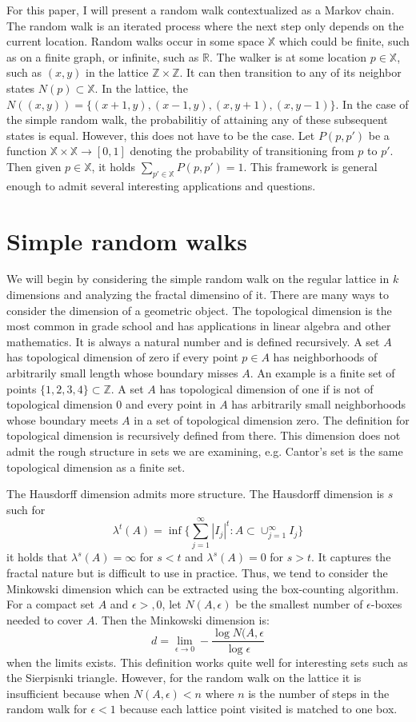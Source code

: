 \documentclass{article}
\begin{document}
For this paper, I will present a random walk contextualized as a Markov chain. The random walk is an iterated process where the next step only depends on the current location. Random walks occur in some space $\mathbb{X}$ which could be finite, such as on a finite graph, or infinite, such as $\mathbb{R}$. The walker is at some location $p \in \mathbb{X}$, such as $(x,y)$ in the lattice $\mathbb{Z} \times \mathbb{Z}$. It can then transition to any of its neighbor states $N(p) \subset \mathbb{X}$. In the lattice, the $N((x,y)) = \{(x+1, y), (x-1, y), (x,y+1), (x,y-1)\}$. In the case of the simple random walk, the probabilitiy of attaining any of these subsequent states is equal. However, this does not have to be the case. Let $P(p, p')$ be a function $\mathbb{X} \times \mathbb{X} \to [0,1]$ denoting the probability of transitioning from $p$ to $p'$. Then given $p \in \mathbb{X}$, it holds $\sum_{p' \in \mathbb{X}} P(p, p') = 1$. This framework is general enough to admit several interesting applications and questions. 

\section{Simple random walks}
We will begin by considering the simple random walk on the regular lattice in $k$ dimensions and analyzing the fractal dimensino of it. There are many ways to consider the dimension of a geometric object. The topological dimension is the most common in grade school and has applications in linear algebra and other mathematics. It is always a natural number and is defined recursively. A set $A$ has topological dimension of zero if every point $p \in A$ has neighborhoods of arbitrarily small length whose boundary misses $A$. An example is a finite set of points $\{1, 2, 3, 4\} \subset \mathbb{Z}$. A set $A$ has topological dimension of one if is not of topological dimension 0 and every point in $A$ has arbitrarily small neighborhoods whose boundary meets $A$ in a set of topological dimension zero. The definition for topological dimension is recursively defined from there. This dimension does not admit the rough structure in sets we are examining, e.g. Cantor's set is the same topological dimension as a finite set. 

The Hausdorff dimension admits more structure. The Hausdorff dimension is $s$ such for 
\[ \lambda^t(A) = \inf \{ \sum_{j=1}^\infty |I_j|^t : A \subset \cup_{j=1}^{\infty} I_j \} \] it holds that $\lambda^s(A) = \infty$ for $s < t$ and $\lambda ^s(A) = 0$ for $s > t$. It captures the fractal nature but is difficult to use in practice. Thus, we tend to consider the Minkowski dimension which can be extracted using the box-counting algorithm. For a compact set $A$ and $\epsilon >, 0$, let $N(A, \epsilon)$ be the smallest number of $\epsilon$-boxes needed to cover $A$. Then the Minkowski dimension is:
\[d = \lim_{\epsilon \to 0} - \frac{\log N(A, \epsilon}{\log \epsilon} \] when the limits exists. This definition works quite well for interesting sets such as the Sierpisnki triangle. However, for the random walk on the lattice it is insufficient because when $N(A,\epsilon) < n$ where $n$ is the number of steps in the random walk for $\epsilon < 1$ because each lattice point visited is matched to one box. 
\end{document}
